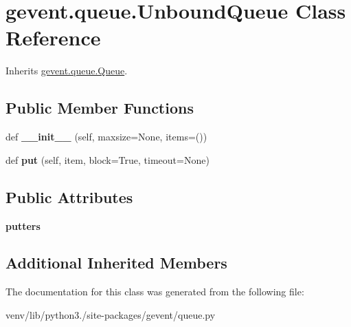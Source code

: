 \hypertarget{classgevent_1_1queue_1_1_unbound_queue}{}\section{gevent.\+queue.\+Unbound\+Queue Class Reference}
\label{classgevent_1_1queue_1_1_unbound_queue}


Inherits \hyperlink{classgevent_1_1queue_1_1_queue}{gevent.\+queue.\+Queue}.

\subsection*{Public Member Functions}
\begin{DoxyCompactItemize}
\item 
\mbox{\label{classgevent_1_1queue_1_1_unbound_queue_a6d8a1fb728e5431233e3c6a6f12bb651}} 
def {\bfseries \+\_\+\+\_\+init\+\_\+\+\_\+} (self, maxsize=None, items=())
\item 
\mbox{\label{classgevent_1_1queue_1_1_unbound_queue_a4fbfe41a3869db1213e7bbb566f53c22}} 
def {\bfseries put} (self, item, block=True, timeout=None)
\end{DoxyCompactItemize}
\subsection*{Public Attributes}
\begin{DoxyCompactItemize}
\item 
\mbox{\label{classgevent_1_1queue_1_1_unbound_queue_abeec03bfdb67f9ac66603430a163b0bb}} 
{\bfseries putters}
\end{DoxyCompactItemize}
\subsection*{Additional Inherited Members}


The documentation for this class was generated from the following file\+:\begin{DoxyCompactItemize}
\item 
venv/lib/python3./site-\/packages/gevent/queue.\+py\end{DoxyCompactItemize}
